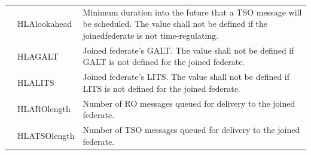 \begin{landscape}
\begin{momtabletypeset}[8.00]
{{\begin{tabular}{|Y{110.17pt}|Y{128.60pt}|Y{391.97pt}|}
                    & HLAlookahead                                 & Minimum duration into the future that a TSO message will be scheduled.\allowbreak{} The value shall not be defined if the joined\allowbreak{}federate is not time-regulating.\allowbreak{}                                                                                                                                                                                                                                                                                                 \\
                    & HLAGALT                                      & Joined federate's GALT.\allowbreak{} The value shall not be defined if GALT is not defined for the joined federate.\allowbreak{}                                                                                                                                                                                                                                                                                                                                                           \\
                    & HLALITS                                      & Joined federate's LITS.\allowbreak{} The value shall not be defined if LITS is not defined for the joined federate.\allowbreak{}                                                                                                                                                                                                                                                                                                                                                           \\
                    & HLAROlength                                  & Number of RO messages queued for delivery to the joined federate.\allowbreak{}                                                                                                                                                                                                                                                                                                                                                                                                             \\
                    & HLATSOlength                                 & Number of TSO messages queued for delivery to the joined federate.\allowbreak{}                                                                                                                                                                                                                                                                                                                                                                                                            \\

\end{tabular}}}
\end{momtabletypeset}
\end{landscape}
